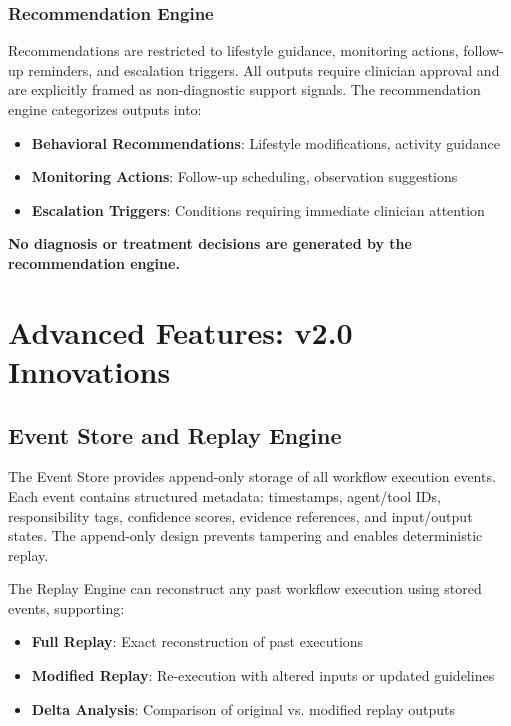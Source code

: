 \documentclass[conference]{IEEEtran}
\begin{document}
\subsubsection{Recommendation Engine}
Recommendations are restricted to lifestyle guidance, monitoring actions, follow-up reminders, and escalation triggers. All outputs require clinician approval and are explicitly framed as non-diagnostic support signals. The recommendation engine categorizes outputs into:

\begin{itemize}
    \item \textbf{Behavioral Recommendations}: Lifestyle modifications, activity guidance
    \item \textbf{Monitoring Actions}: Follow-up scheduling, observation suggestions
    \item \textbf{Escalation Triggers}: Conditions requiring immediate clinician attention
\end{itemize}

\textbf{No diagnosis or treatment decisions are generated by the recommendation engine.}

\section{Advanced Features: v2.0 Innovations}

\subsection{Event Store and Replay Engine}
The Event Store provides append-only storage of all workflow execution events. Each event contains structured metadata: timestamps, agent/tool IDs, responsibility tags, confidence scores, evidence references, and input/output states. The append-only design prevents tampering and enables deterministic replay.

The Replay Engine can reconstruct any past workflow execution using stored events, supporting:
\begin{itemize}
    \item \textbf{Full Replay}: Exact reconstruction of past executions
    \item \textbf{Modified Replay}: Re-execution with altered inputs or updated guidelines
    \item \textbf{Delta Analysis}: Comparison of original vs. modified replay outputs
\end{itemize}
\end{document}
